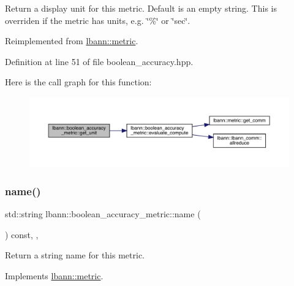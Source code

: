 Return a display unit for this metric. Default is an empty string. This is overriden if the metric has units, e.\+g. \char`\"{}\%\char`\"{} or \char`\"{}sec\char`\"{}. 

Reimplemented from \hyperlink{classlbann_1_1metric_a13fd302dec85190b877f7146529e516c}{lbann\+::metric}.



Definition at line 51 of file boolean\+\_\+accuracy.\+hpp.


Here is the call graph for this function\+:\nopagebreak
\begin{figure}[H]
\begin{center}
\leavevmode
\includegraphics[width=350pt]{classlbann_1_1boolean__accuracy__metric_abde43253ef54b243f9faa1b1adea0672_cgraph}
\end{center}
\end{figure}
\mbox{\label{classlbann_1_1boolean__accuracy__metric_a88edde5abce60809dbaaf034b166b09e}} 
\subsubsection{\texorpdfstring{name()}{name()}}
{\footnotesize\ttfamily std\+::string lbann\+::boolean\+\_\+accuracy\+\_\+metric\+::name (\begin{DoxyParamCaption}{ }\end{DoxyParamCaption}) const\hspace{0.3cm}{\ttfamily [inline]}, {\ttfamily [override]}, {\ttfamily [virtual]}}

Return a string name for this metric. 

Implements \hyperlink{classlbann_1_1metric_af455d7b6874d3491bc04f0f2ebfcab51}{lbann\+::metric}.



